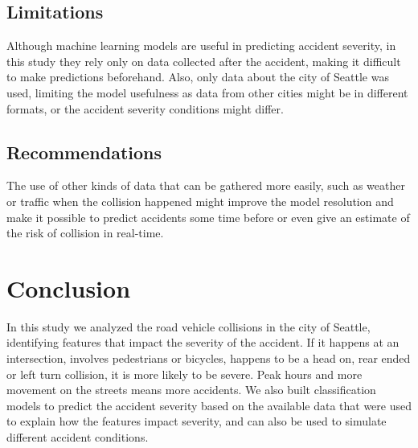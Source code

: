 \documentclass[12pt]{article}
\begin{document}
\subsection{Limitations}

Although machine learning models are useful in predicting accident severity, in this study they rely only on data collected after the accident, making it difficult to make predictions beforehand. Also, only data about the city of Seattle was used, limiting the model usefulness as data from other cities might be in different formats, or the accident severity conditions might differ.

\subsection{Recommendations}

The use of other kinds of data that can be gathered more easily, such as weather or traffic when the collision happened might improve the model resolution and make it possible to predict accidents some time before or even give an estimate of the risk of collision in real-time.

\section{Conclusion}

In this study we analyzed the road vehicle collisions in the city of Seattle, identifying features that impact the severity of the accident. If it happens at an intersection, involves pedestrians or bicycles, happens to be a head on, rear ended or left turn collision, it is more likely to be severe. Peak hours and more movement on the streets means more accidents. We also built classification models to predict the accident severity based on the available data that were used to explain how the features impact severity, and can also be used to simulate different accident conditions.
\end{document}
